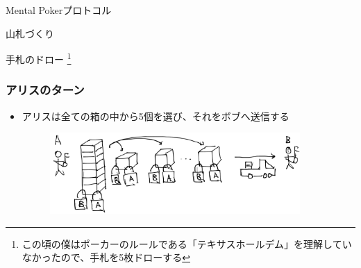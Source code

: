 
\begin{frame}

  \centering
  {\huge Mental Pokerプロトコル}

  \vspace{1em}

  \begin{itemize}
    {\color{gray!50}
      \item 山札づくり
    }

    \item 手札のドロー%
    \footnote[frame]{この頃の僕はポーカーのルールである「テキサスホールデム」を理解していなかったので、手札を5枚ドローする}
  \end{itemize}
\end{frame}

\begin{frame}
  \frametitle{\showAndIncrement アリスのターン}

  \begin{itemize}
    \item アリスは全ての箱の中から5個を選び、それをボブへ送信する
    \begin{figure}[h]
      \includegraphics[width=0.9\textwidth]{img/select_boxes.png}
    \end{figure}
  \end{itemize}
\end{frame}

